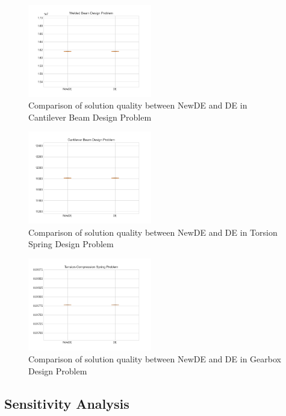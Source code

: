 \documentclass[conference]{IEEEtran}
\begin{document}
\begin{figure}[H]
    \centering
    \includegraphics[width=0.48\textwidth]{6Figure_1.png}
    \caption{Comparison of solution quality between NewDE and DE in Cantilever Beam Design Problem}
    \label{fig6}
\end{figure}

\begin{figure}[H]
    \centering
    \includegraphics[width=0.48\textwidth]{7Figure_1.png}
    \caption{Comparison of solution quality between NewDE and DE in Torsion Spring Design Problem}
    \label{fig7}
\end{figure}

\begin{figure}[H]
    \centering
    \includegraphics[width=0.48\textwidth]{8Figure_1.png}
    \caption{Comparison of solution quality between NewDE and DE in Gearbox Design Problem}
    \label{fig8}
\end{figure}

\subsection{Sensitivity Analysis}
\end{document}
